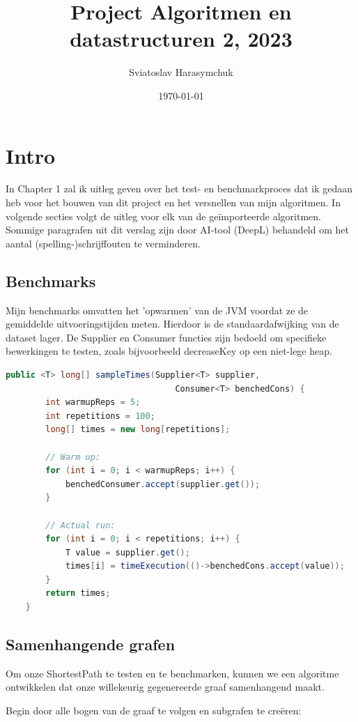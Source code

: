 \documentclass[12pt,a4paper,fleqn]{report}
\title{Project Algoritmen en datastructuren 2, 2023}
\author{Sviatoslav Harasymchuk}
\date{\today}
\begin{document}
	\maketitle

	\tableofcontents

	\chapter{Intro}
	In Chapter 1 zal ik uitleg geven over het test- en benchmarkproces dat ik gedaan heb
	voor het bouwen van dit project en het versnellen van mijn algoritmen.
	In volgende secties volgt de uitleg voor elk van de geïmporteerde algoritmen.
	Sommige paragrafen uit dit verslag zijn door AI-tool (DeepL) behandeld
	om het aantal (spelling-)schrijffouten te verminderen.
	\section{Benchmarks}
	Mijn benchmarks omvatten het 'opwarmen' van de \textsf{JVM} voordat ze de gemiddelde
	uitvoeringstijden meten. Hierdoor is de standaardafwijking van de dataset lager. De
	\textsf{Supplier} en \textsf{Consumer} functies zijn bedoeld om specifieke bewerkingen
	te testen, zoals bijvoorbeeld \textsf{decreaseKey} op een niet-lege heap.
	\begin{lstlisting}[language=Java]
	public <T> long[] sampleTimes(Supplier<T> supplier,
	                              Consumer<T> benchedCons) {
		int warmupReps = 5;
		int repetitions = 100;
		long[] times = new long[repetitions];

		// Warm up:
		for (int i = 0; i < warmupReps; i++) {
			benchedConsumer.accept(supplier.get());
		}

		// Actual run:
		for (int i = 0; i < repetitions; i++) {
			T value = supplier.get();
			times[i] = timeExecution(()->benchedCons.accept(value));
		}
		return times;
	}
\end{lstlisting}

	\section{Samenhangende grafen}

	Om onze ShortestPath te testen en te benchmarken, kunnen we een algoritme ontwikkelen dat onze willekeurig gegenereerde graaf samenhangend maakt.

	Begin door alle bogen van de graaf te volgen en subgrafen te creëren:
\end{document}
